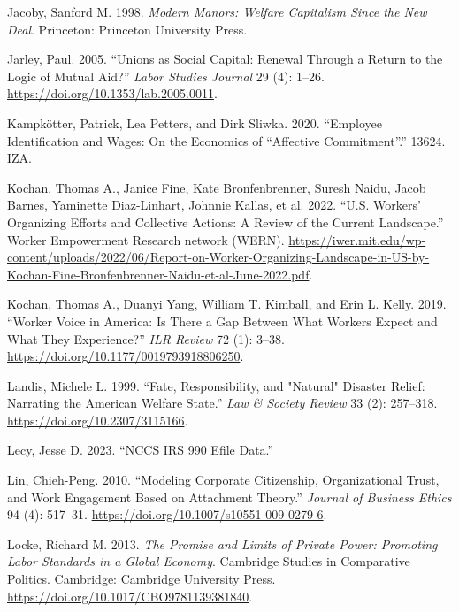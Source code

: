 \documentclass[
  11pt,
  oneside]{article}
\newlength{\cslhangindent}
\newenvironment{CSLReferences}[2] %
 {\begin{list}{}{%
  \setlength{\itemindent}{0pt}
  \setlength{\leftmargin}{0pt}
  \setlength{\parsep}{0pt}
  \ifodd #1
   \setlength{\leftmargin}{\cslhangindent}
   \setlength{\itemindent}{-1\cslhangindent}
  \fi
  \setlength{\itemsep}{#2\baselineskip}}}
 {\end{list}}
\begin{document}
\begin{CSLReferences}{1}{0}
Jacoby, Sanford M. 1998. \emph{Modern {Manors}: {Welfare Capitalism} Since the {New Deal}}. Princeton: Princeton University Press.

Jarley, Paul. 2005. {``Unions as {Social} {Capital}: {Renewal} Through a {Return} to the {Logic} of {Mutual} {Aid}?''} \emph{Labor Studies Journal} 29 (4): 1--26. \url{https://doi.org/10.1353/lab.2005.0011}.

Kampkötter, Patrick, Lea Petters, and Dirk Sliwka. 2020. {``Employee {Identification} and {Wages}: {On} the {Economics} of {``}{Affective} {Commitment}{''}.''} 13624. IZA.

Kochan, Thomas A., Janice Fine, Kate Bronfenbrenner, Suresh Naidu, Jacob Barnes, Yaminette Diaz-Linhart, Johnnie Kallas, et al. 2022. {``U.{S}. {Workers}{'} {Organizing} {Efforts} and {Collective} {Actions}: {A} {Review} of the {Current} {Landscape}.''} Worker Empowerment Research network (WERN). \url{https://iwer.mit.edu/wp-content/uploads/2022/06/Report-on-Worker-Organizing-Landscape-in-US-by-Kochan-Fine-Bronfenbrenner-Naidu-et-al-June-2022.pdf}.

Kochan, Thomas A., Duanyi Yang, William T. Kimball, and Erin L. Kelly. 2019. {``Worker {Voice} in {America}: {Is} {There} a {Gap} Between {What} {Workers} {Expect} and {What} {They} {Experience}?''} \emph{ILR Review} 72 (1): 3--38. \url{https://doi.org/10.1177/0019793918806250}.

Landis, Michele L. 1999. {``Fate, {Responsibility}, and "{Natural}" {Disaster} {Relief}: {Narrating} the {American} {Welfare} {State}.''} \emph{Law \& Society Review} 33 (2): 257--318. \url{https://doi.org/10.2307/3115166}.

Lecy, Jesse D. 2023. {``{NCCS IRS} 990 {Efile Data}.''}

Lin, Chieh-Peng. 2010. {``Modeling {Corporate} {Citizenship}, {Organizational} {Trust}, and {Work} {Engagement} {Based} on {Attachment} {Theory}.''} \emph{Journal of Business Ethics} 94 (4): 517--31. \url{https://doi.org/10.1007/s10551-009-0279-6}.

Locke, Richard M. 2013. \emph{The {Promise} and {Limits} of {Private} {Power}: {Promoting} {Labor} {Standards} in a {Global} {Economy}}. Cambridge {Studies} in {Comparative} {Politics}. Cambridge: Cambridge University Press. \url{https://doi.org/10.1017/CBO9781139381840}.


\end{CSLReferences}
\end{document}
